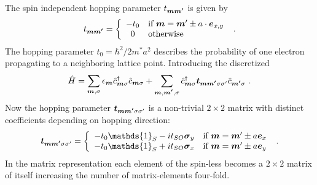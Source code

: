 The spin independent hopping parameter $t_{\boldsymbol{m}\boldsymbol{m'}}$ is given by
\begin{align}
t_{\boldsymbol{m}\boldsymbol{m'}} = \left\{ \begin{array}[c]{cl} -t_0 & \text{if } \boldsymbol{m} = \boldsymbol{m}' \pm a \cdot \boldsymbol{e}_{x,y} \\ 0 & \text{otherwise} \end{array} \right.\ .
	\label{eqn:t0hopping}
\end{align}
The hopping parameter $t_0 = \hbar^2/2m^*a^2$ describes the probability of one electron propagating to a neighboring lattice point. Introducing the discretized \rash{} \hamil{}
\begin{align}
	\hat{H} = \sum_{\boldsymbol{m},\sigma} \epsilon_{\boldsymbol{m}} \hat{c}^{\dagger}_{\boldsymbol{m}\sigma} \hat{c}_{\boldsymbol{m}\sigma} +
	\sum_{\boldsymbol{m},\boldsymbol{m'},\sigma}  \hat{c}^{\dagger}_{\boldsymbol{m}\sigma} \boldsymbol{t}_{\boldsymbol{m}\boldsymbol{m'}\sigma\sigma '} \hat{c}_{\boldsymbol{m'}\sigma}\ .
	\label{eqn:discretizedrashbahamil}
\end{align}
Now the hopping parameter $\boldsymbol{t}_{\boldsymbol{m}\boldsymbol{m'}\sigma\sigma '}$ is a non-trivial $2 \times 2$ matrix with distinct coefficients depending on hopping direction:
\begin{align}
	\mat{t}_{\v{m}\v{m'}\sigma\sigma '} = \left\{ \begin{array}[c]{cl} -t_0\mathds{1}_S - i t_{SO} \mat{\sigma}_y & \text{if } \v{m} = \v{m}' \pm a \v{e}_{x} \\
		-t_0\mathds{1}_S + i t_{SO} \mat{\sigma}_x & \text{if } \v{m} = \v{m}' \pm a \v{e}_{y} \end{array} \right.\ .
	\label{eqn:tsohopping}
\end{align}
In the matrix representation each element of the spin-less \hamil{} becomes a $2 \times 2$ matrix of itself increasing the number of matrix-elements four-fold.
